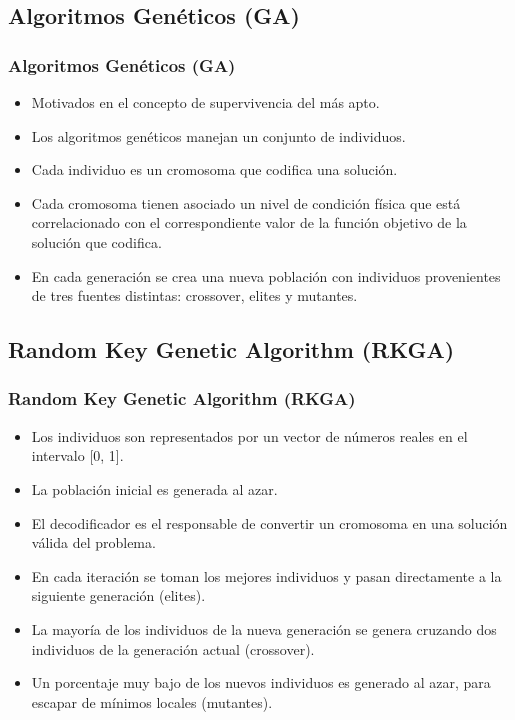 \documentclass{beamer}
\begin{document}

\subsection{Algoritmos Genéticos (GA)}

\begin{frame}
\frametitle{Algoritmos Genéticos (GA)}

\begin{itemize}
    \item Motivados en el concepto de supervivencia del más apto.
    \pause
    \item Los algoritmos genéticos manejan un conjunto de individuos.
    \pause
    \item Cada individuo es un cromosoma que codifica una solución.
    \pause
    \item Cada cromosoma tienen asociado un nivel de condición física que está correlacionado con el correspondiente valor de la función objetivo de la solución que codifica.
    \pause
    \item En cada generación se crea una nueva población con individuos provenientes de tres fuentes distintas: crossover, elites y mutantes.
\end{itemize}

\end{frame}


\subsection{Random Key Genetic Algorithm (RKGA)}

\begin{frame}
\frametitle{Random Key Genetic Algorithm (RKGA)}

\begin{itemize}
    \item Los individuos son representados por un vector de números reales en el intervalo [0, 1].
    \pause
    \item La población inicial es generada al azar.
    \pause
    \item El decodificador es el responsable de convertir un cromosoma en una solución válida del problema.
    \pause
    \item En cada iteración se toman los mejores individuos y pasan directamente a la siguiente generación (elites).
    \pause
    \item La mayoría de los individuos de la nueva generación se genera cruzando dos individuos de la generación actual (crossover).
    \pause
    \item Un porcentaje muy bajo de los nuevos individuos es generado al azar, para escapar de mínimos locales (mutantes).
\end{itemize}

\end{frame}
\end{document}
